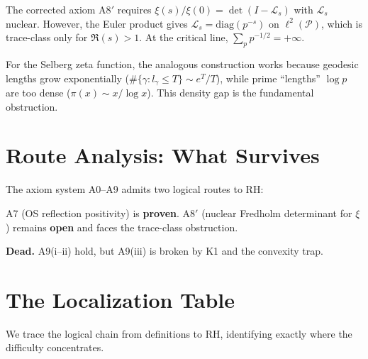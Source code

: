 \documentclass[12pt,a4paper]{article}
\theoremstyle{definition}
\theoremstyle{remark}
\newcommand{\PP}{\mathcal{P}}
\begin{document}
The corrected axiom A8$'$ requires $\xi(s)/\xi(0) = \det(I - \mathcal{L}_s)$ with $\mathcal{L}_s$ nuclear. However, the Euler product gives $\mathcal{L}_s = \mathrm{diag}(p^{-s})$ on $\ell^2(\PP)$, which is trace-class only for $\Re(s) > 1$. At the critical line, $\sum_p p^{-1/2} = +\infty$.

For the Selberg zeta function, the analogous construction works because geodesic lengths grow exponentially ($\#\{\gamma: l_\gamma \leq T\} \sim e^T/T$), while prime ``lengths'' $\log p$ are too dense ($\pi(x) \sim x/\log x$). This density gap is the fundamental obstruction.


\section{Route Analysis: What Survives}
\label{sec:routes}

The axiom system A0--A9 admits two logical routes to RH:

\begin{description}[font=\bfseries,leftmargin=2em]
  \item[Route 1 (A7 + A8$'$):] A7 (OS reflection positivity) is \textbf{proven}. A8$'$ (nuclear Fredholm determinant for $\xi$) remains \textbf{open} and faces the trace-class obstruction.
  \item[Route 2 (A9):] \textbf{Dead.} A9(i--ii) hold, but A9(iii) is broken by K1 and the convexity trap.
\end{description}


\section{The Localization Table}
\label{sec:localization}

We trace the logical chain from definitions to RH, identifying exactly where the difficulty concentrates.
\end{document}
